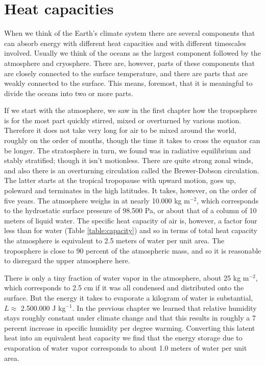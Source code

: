 \documentclass[12pt]{book}
\begin{document}
\section{Heat capacities}
When we think of the Earth's climate system there are several components that can absorb energy with different heat capacities and with different timescales involved. Usually we think of the oceans as the largest component followed by the atmosphere and cryosphere. There are, however, parts of these components that are closely connected to the surface temperature, and there are parts that are weakly connected to the surface. This means, foremost, that it is meaningful to divide the oceans into two or more parts.

If we start with the atmosphere, we saw in the first chapter how the troposphere is for the most part quickly stirred, mixed or overturned by various motion. Therefore it does not take very long for air to be mixed around the world, roughly on the order of months, though the time it takes to cross the equator can be longer. The stratosphere in turn, we found was in radiative equilibrium and stably stratified; though it isn't motionless. There are quite strong zonal winds, and also there is an overturning circulation called the Brewer-Dobson circulation. The latter starts at the tropical tropopause with upward motion, goes up, poleward and terminates in the high latitudes. It takes, however, on the order of five years. The atmosphere weighs in at nearly 10.000 kg m$^{-2}$, which corresponds to the hydrostatic surface pressure of 98.500 Pa, or about that of a column of 10 meters of liquid water. The specific heat capacity of air is, however, a factor four less than for water (Table \ref{table:capacity}) and so in terms of total heat capacity the atmosphere is equivalent to 2.5 meters of water per unit area. The troposphere is close to 90 percent of the atmospheric mass, and so it is reasonable to disregard the upper atmosphere here. 

There is only a tiny fraction of water vapor in the atmosphere, about 25 kg m$^{-2}$, which corresponds to 2.5 cm if it was all condensed and distributed onto the surface. But the energy it takes to evaporate a kilogram of water is substantial, $L \approx $  2.500.000 J kg$^{-1}$. In the previous chapter we learned that relative humidity stays roughly constant under climate change and that this results in roughly a 7 percent increase in specific humidity per degree warming. Converting this latent heat into an equivalent heat capacity we find that the energy storage due to evaporation of water vapor corresponds to about 1.0 meters of water per unit area.
\end{document}
